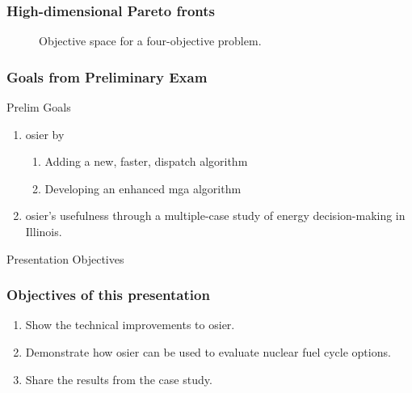 \begin{frame}
    \frametitle{High-dimensional Pareto fronts}
    \begin{figure}
        \centering
        \resizebox{\columnwidth}{!}{}
        \caption{Objective space for a four-objective problem.}
        \label{fig:4-obj-space}
    \end{figure}
\end{frame}


\begin{frame}
    \frametitle{Goals from Preliminary Exam}

    \begin{block}{Prelim Goals}
        \begin{enumerate}[<+->]
            \item {} \gls{osier} by
            \begin{enumerate}
                \item Adding a new, faster, dispatch algorithm
                \item Developing an enhanced \gls{mga} algorithm
            \end{enumerate}
            \item {} \gls{osier}'s usefulness through a 
            multiple-case study of energy decision-making in Illinois.
        \end{enumerate}
    \end{block}
    \pause
    \begin{block}{Presentation Objectives}
        \frametitle{Objectives of this presentation}
        \begin{enumerate}[<+->]
            \item Show the technical improvements to \gls{osier}.
            \item Demonstrate how \gls{osier} can be used to evaluate nuclear fuel cycle options.
            \item Share the results from the case study.
        \end{enumerate}
    \end{block}
\end{frame}